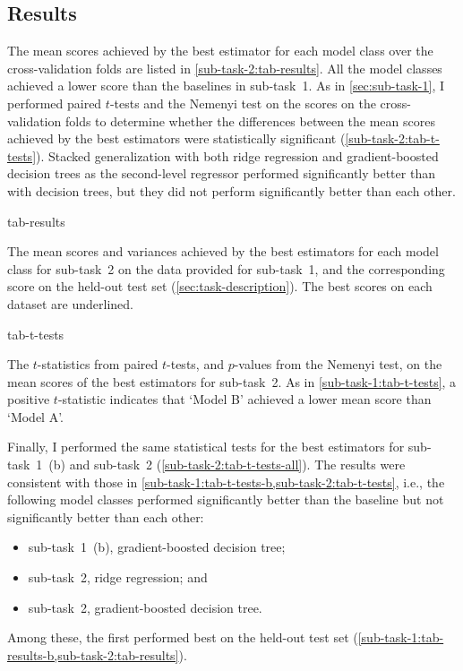 \subsection{Results}
\label{sec:sub-task-2:results}

The mean scores achieved by the best estimator for each model class over the
cross-validation folds are listed in \cref{sub-task-2:tab-results}.
All the model classes achieved a lower score than the baselines in sub-task~1.
As in \cref{sec:sub-task-1}, I performed paired $t$-tests and the Nemenyi test on the
scores on the cross-validation folds to determine whether the differences between the
mean scores achieved by the best estimators were statistically significant
(\cref{sub-task-2:tab-t-tests}).
Stacked generalization with both ridge regression and gradient-boosted decision trees
as the second-level regressor performed significantly better than with decision trees,
but they did not perform significantly better than each other.

\begin{table}
  \centering
  {tab-results}
  \caption{
    The mean scores and variances achieved by the best estimators for each model class
    for sub-task~2 on the data provided for sub-task~1, and the corresponding score on
    the held-out test set (\cref{sec:task-description}).
    The best scores on each dataset are underlined.
  }
  \label{sub-task-2:tab-results}
\end{table}

\begin{table}
  \centering
  {tab-t-tests}
  \caption{The $t$-statistics from paired $t$-tests, and $p$-values from the Nemenyi
    test, on the mean scores of the best estimators for sub-task~2.
    As in \cref{sub-task-1:tab-t-tests}, a positive $t$-statistic indicates that `Model B'
    achieved a lower mean score than `Model A'.
  }
  \label{sub-task-2:tab-t-tests}
\end{table}

Finally, I performed the same statistical tests for the best estimators for
sub-task~1~(b) and sub-task~2 (\cref{sub-task-2:tab-t-tests-all}).
The results were consistent with those in
\cref{sub-task-1:tab-t-tests-b,sub-task-2:tab-t-tests}, i.e., the following model classes
performed significantly better than the baseline but not significantly better than
each other:
\begin{itemize}
  \item sub-task~1~(b), gradient-boosted decision tree;
  \item sub-task~2, ridge regression; and
  \item sub-task~2, gradient-boosted decision tree.
\end{itemize}
Among these, the first performed best on the held-out test set
(\cref{sub-task-1:tab-results-b,sub-task-2:tab-results}).

